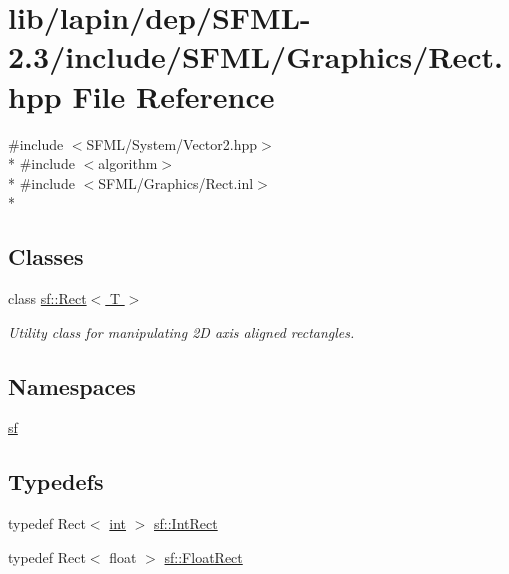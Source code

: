 \hypertarget{lapin_2dep_2_s_f_m_l-2_83_2include_2_s_f_m_l_2_graphics_2_rect_8hpp}{\section{lib/lapin/dep/\-S\-F\-M\-L-\/2.3/include/\-S\-F\-M\-L/\-Graphics/\-Rect.hpp File Reference}
\label{lapin_2dep_2_s_f_m_l-2_83_2include_2_s_f_m_l_2_graphics_2_rect_8hpp}
}
{\ttfamily \#include $<$S\-F\-M\-L/\-System/\-Vector2.\-hpp$>$}\\*
{\ttfamily \#include $<$algorithm$>$}\\*
{\ttfamily \#include $<$S\-F\-M\-L/\-Graphics/\-Rect.\-inl$>$}\\*
\subsection*{Classes}
\begin{DoxyCompactItemize}
\item 
class \hyperlink{classsf_1_1_rect}{sf\-::\-Rect$<$ T $>$}
\begin{DoxyCompactList}\small\item\em Utility class for manipulating 2\-D axis aligned rectangles. \end{DoxyCompactList}\end{DoxyCompactItemize}
\subsection*{Namespaces}
\begin{DoxyCompactItemize}
\item 
\hyperlink{namespacesf}{sf}
\end{DoxyCompactItemize}
\subsection*{Typedefs}
\begin{DoxyCompactItemize}
\item 
typedef Rect$<$ \hyperlink{term__entry_8h_ad65b480f8c8270356b45a9890f6499ae}{int} $>$ \hyperlink{namespacesf_a1b1279ab06950b96686cffaacb72fed5}{sf\-::\-Int\-Rect}
\item 
typedef Rect$<$ float $>$ \hyperlink{namespacesf_ab0d978f5903922a6bdfca1736b71ccc9}{sf\-::\-Float\-Rect}
\end{DoxyCompactItemize}
